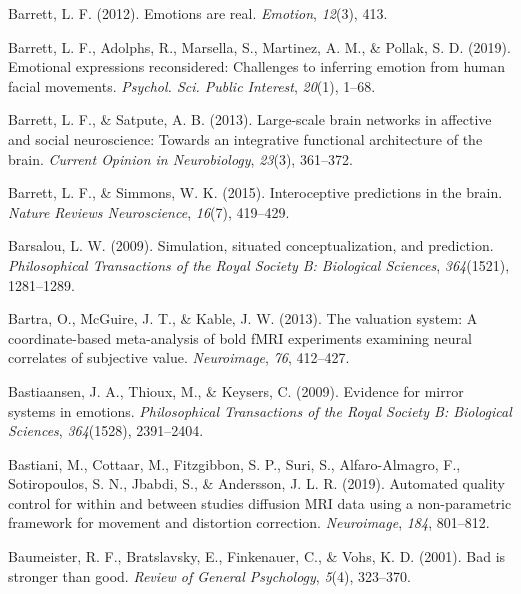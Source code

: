 \documentclass[11pt,american,a4paper,oneside,]{memoir} %
\begin{document}
\leavevmode\hypertarget{ref-barrett2012emotions}{}%
Barrett, L. F. (2012). Emotions are real. \emph{Emotion}, \emph{12}(3), 413.

\leavevmode\hypertarget{ref-Barrett2019-bc}{}%
Barrett, L. F., Adolphs, R., Marsella, S., Martinez, A. M., \& Pollak, S. D. (2019). Emotional expressions reconsidered: Challenges to inferring emotion from human facial movements. \emph{Psychol. Sci. Public Interest}, \emph{20}(1), 1--68.

\leavevmode\hypertarget{ref-barrett2013large}{}%
Barrett, L. F., \& Satpute, A. B. (2013). Large-scale brain networks in affective and social neuroscience: Towards an integrative functional architecture of the brain. \emph{Current Opinion in Neurobiology}, \emph{23}(3), 361--372.

\leavevmode\hypertarget{ref-barrett2015interoceptive}{}%
Barrett, L. F., \& Simmons, W. K. (2015). Interoceptive predictions in the brain. \emph{Nature Reviews Neuroscience}, \emph{16}(7), 419--429.

\leavevmode\hypertarget{ref-barsalou2009simulation}{}%
Barsalou, L. W. (2009). Simulation, situated conceptualization, and prediction. \emph{Philosophical Transactions of the Royal Society B: Biological Sciences}, \emph{364}(1521), 1281--1289.

\leavevmode\hypertarget{ref-bartra2013valuation}{}%
Bartra, O., McGuire, J. T., \& Kable, J. W. (2013). The valuation system: A coordinate-based meta-analysis of bold fMRI experiments examining neural correlates of subjective value. \emph{Neuroimage}, \emph{76}, 412--427.

\leavevmode\hypertarget{ref-bastiaansen2009evidence}{}%
Bastiaansen, J. A., Thioux, M., \& Keysers, C. (2009). Evidence for mirror systems in emotions. \emph{Philosophical Transactions of the Royal Society B: Biological Sciences}, \emph{364}(1528), 2391--2404.

\leavevmode\hypertarget{ref-Bastiani2019-sm}{}%
Bastiani, M., Cottaar, M., Fitzgibbon, S. P., Suri, S., Alfaro-Almagro, F., Sotiropoulos, S. N., Jbabdi, S., \& Andersson, J. L. R. (2019). Automated quality control for within and between studies diffusion MRI data using a non-parametric framework for movement and distortion correction. \emph{Neuroimage}, \emph{184}, 801--812.

\leavevmode\hypertarget{ref-baumeister2001bad}{}%
Baumeister, R. F., Bratslavsky, E., Finkenauer, C., \& Vohs, K. D. (2001). Bad is stronger than good. \emph{Review of General Psychology}, \emph{5}(4), 323--370.
\end{document}
